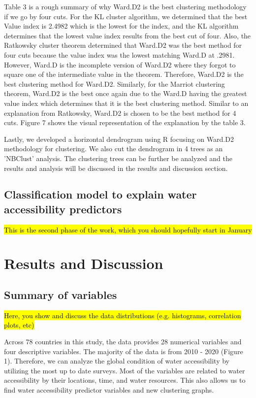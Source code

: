 \documentclass[10pt,twoside]{article}
\numberwithin{equation}{section}
\newcommand{\?}{\stackrel{?}{=}}
\begin{document}
Table 3 is a rough summary of why Ward.D2 is the best clustering methodology if we go by four cuts. For the KL cluster algorithm, we determined that the best Value index is 2.4982 which is the lowest for the index, and the KL algorithm determines that the lowest value index results from the best cut of four. Also, the Ratkowsky cluster theorem determined that Ward.D2 was the best method for four cuts because the value index was the lowest matching Ward.D at .2981. However, Ward.D is the incomplete version of Ward.D2 where they forgot to square one of the intermediate value in the theorem. Therefore, Ward.D2 is the best clustering method for Ward.D2. Similarly, for the Marriot clustering theorem, Ward.D2 is the best once again due to the Ward.D having the greatest value index which determines that it is the best clustering method. Similar to an explanation from Ratkowsky, Ward.D2 is chosen to be the best method for 4 cuts. Figure 7 shows the visual representation of the explanation by the table 3. 

Lastly, we developed a horizontal dendrogram using R focusing on Ward.D2 methodology for clustering. We also cut the dendrogram in 4 trees as an 'NBClust' analysis. The clustering trees can be further be analyzed and the results and analysis will be discussed in the results and discussion section. 



\subsection*{Classification model to explain water accessibility predictors}
\hl{This is the second phase of the work, which you should hopefully start in January}


\section*{Results and Discussion}
\subsection*{Summary of variables}
\hl{Here, you show and discuss the data distributions (e.g. histograms, correlation plots, etc)}

Across 78 countries in this study, the data provides 28 numerical variables and four descriptive variables. The majority of the data is from 2010 - 2020 (Figure 1). Therefore, we can analyze the global condition of water accessibility by utilizing the most up to date surveys. Most of the variables are related to water accessibility by their locations, time, and water resources. This also allows us to find water accessibility predictor variables and new clustering graphs. 
\end{document}
